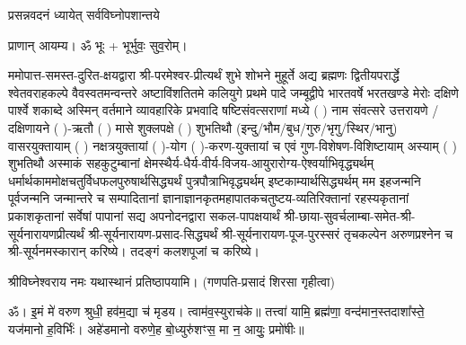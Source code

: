 
\setlength{\parindent}{0pt}





{प्रसन्नवदनं ध्यायेत् सर्वविघ्नोपशान्तये}
 
प्राणान्  आयम्य।  ॐ भूः + भूर्भुवः॒ सुव॒रोम्।


ममोपात्त-समस्त-दुरित-क्षयद्वारा श्री-परमेश्वर-प्रीत्यर्थं शुभे शोभने मुहूर्ते अद्य ब्रह्मणः
द्वितीयपरार्द्धे श्वेतवराहकल्पे वैवस्वतमन्वन्तरे अष्टाविंशतितमे कलियुगे प्रथमे पादे
जम्बूद्वीपे भारतवर्षे भरतखण्डे मेरोः दक्षिणे पार्श्वे शकाब्दे अस्मिन् वर्तमाने व्यावहारिके
प्रभवादि षष्टिसंवत्सराणां मध्ये (	) नाम संवत्सरे उत्तरायणे / दक्षिणायने  (  )-ऋतौ  (  ) मासे 
शुक्लपक्षे (  ) शुभतिथौ (इन्दु/भौम/बुध/गुरु/भृगु/स्थिर/भानु) वासरयुक्तायाम्
(  ) नक्षत्रयुक्तायां (  )-योग (  )-करण-युक्तायां च एवं गुण-विशेषण-विशिष्टायाम्
अस्याम् (  ) शुभतिथौ अस्माकं सहकुटुम्बानां क्षेमस्थैर्य-धैर्य-वीर्य-विजय-आयुरारोग्य-ऐश्वर्याभिवृद्ध्यर्थम्
 धर्मार्थकाममोक्ष\-चतुर्विधफलपुरुषार्थसिद्ध्यर्थं पुत्रपौत्राभिवृद्ध्यर्थम् इष्टकाम्यार्थसिद्ध्यर्थम्
मम इहजन्मनि पूर्वजन्मनि जन्मान्तरे च सम्पादितानां ज्ञानाज्ञानकृतमहा\-पातकचतुष्टय-व्यतिरिक्तानां रहस्यकृतानां प्रकाशकृतानां सर्वेषां पापानां सद्य अपनोदनद्वारा सकल-पापक्षयार्थं 
श्री-छाया-सुवर्चलाम्बा-समेत-श्री-सूर्यनारायणप्रीत्यर्थं
श्री-सूर्यनारायण-प्रसाद-सिद्ध्यर्थं श्री-सूर्यनारायण-पूज-पुरस्सरं तृचकल्पेन अरुणप्रश्नेन च श्री-सूर्यनमस्कारान् 
करिष्ये। तदङ्गं कलशपूजां च करिष्ये।


श्रीविघ्नेश्वराय नमः यथास्थानं प्रतिष्ठापयामि।
(गणपति-प्रसादं शिरसा गृहीत्वा)












 

ॐ। इ॒मं मे॑ वरुण श्रुधी॒ हव॑म॒द्या च॑ मृडय। त्वाम॑व॒स्युराच॑के॥ तत्त्वा॑ यामि॒ ब्रह्म॑णा॒ वन्द॑मान॒स्तदाशा᳚स्ते॒ यज॑मानो ह॒विर्भिः॑। अहे॑डमानो वरुणे॒ह बो॒ध्युरु॑शꣳस॒ मा न॒ आयुः॒ प्रमो॑षीः॥

